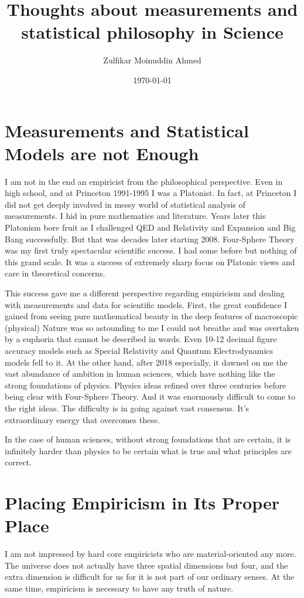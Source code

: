 \documentclass{amsart}
\title{Thoughts about measurements and statistical philosophy in Science}
\author{Zulfikar Moinuddin Ahmed}
\date{\today}
\begin{document}
\maketitle

\section{Measurements and Statistical Models are not Enough}

I am not in the end an empiricist from the philosophical perspective.  Even in high school, and at Princeton 1991-1995 I was a Platonist.  In fact, at Princeton I did not get deeply involved in messy world of statistical analysis of measurements.  I hid in pure mathematics and literature.  Years later this Platonism bore fruit as I challenged QED and Relativity and Expansion and Big Bang successfully.  But that was decades later starting 2008.  Four-Sphere Theory was my first truly spectacular scientific success.  I had some before but nothing of this grand scale. It was a success of extremely sharp focus on Platonic views and care in theoretical concerns.  

This success gave me a different perspective regarding empiricism and dealing with measurements and data for scientific models.  First, the great confidence I gained from seeing pure mathematical beauty in the deep features of macroscopic (physical) Nature was so astounding to me I could not breathe and was overtaken by a euphoria that cannot be described in words.  Even 10-12 decimal figure accuracy models such as Special Relativity and Quantum Electrodynamics models fell to it.  At the other hand, after 2018 especially, it dawned on me the vast abundance of ambition in human sciences, which have nothing like the strong foundations of physics.  Physics ideas refined over three centuries before being clear with Four-Sphere Theory.  And it was enormously difficult to come to the right ideas.  The difficulty is in going against vast consensus.  It's extraordinary energy that overcomes these.  

In the case of human sciences, without strong foundations that are certain, it is infinitely harder than physics to be certain what is true and what principles are correct.  

\section{Placing Empiricism in Its Proper Place}

I am not impressed by hard core empiricists who are material-oriented any more.  The universe does not actually have three spatial dimensions but four, and the extra dimension is difficult for us for it is not part of our ordinary senses. At the same time, empiricism is necessary to have any truth of nature.  
\end{document}
